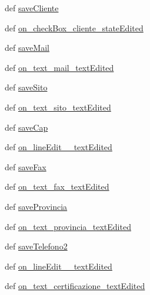 \begin{DoxyCompactItemize}
\item 
def \hyperlink{classmmasgis_1_1anagrafica_1_1MainWindowAnagrafica_a211bc810848f594d4b97622daefb2136}{saveCliente}
\item 
def \hyperlink{classmmasgis_1_1anagrafica_1_1MainWindowAnagrafica_a49cb5bcd710ab2305875e1d5dff5e833}{on\_\-checkBox\_\-cliente\_\-stateEdited}
\item 
def \hyperlink{classmmasgis_1_1anagrafica_1_1MainWindowAnagrafica_a848c61d4921c8052e98a898e7708f224}{saveMail}
\item 
def \hyperlink{classmmasgis_1_1anagrafica_1_1MainWindowAnagrafica_ae1947d5dd3272f69b645d7c59690de17}{on\_\-text\_\-mail\_\-textEdited}
\item 
def \hyperlink{classmmasgis_1_1anagrafica_1_1MainWindowAnagrafica_a3c5ae3353d84a284ad2f940da78ea739}{saveSito}
\item 
def \hyperlink{classmmasgis_1_1anagrafica_1_1MainWindowAnagrafica_aed68f01780840a7592c4b46cf1fc41de}{on\_\-text\_\-sito\_\-textEdited}
\item 
def \hyperlink{classmmasgis_1_1anagrafica_1_1MainWindowAnagrafica_aa1b2ff93cdd2ab41ae8295903011035a}{saveCap}
\item 
def \hyperlink{classmmasgis_1_1anagrafica_1_1MainWindowAnagrafica_a5f185504208c93380aeb97bb14f38b42}{on\_\-lineEdit\_\_\-textEdited}
\item 
def \hyperlink{classmmasgis_1_1anagrafica_1_1MainWindowAnagrafica_a2cd72aa50ba5e97703d7dbca3b55ecad}{saveFax}
\item 
def \hyperlink{classmmasgis_1_1anagrafica_1_1MainWindowAnagrafica_ac9a87c154747985618ff07536352ac94}{on\_\-text\_\-fax\_\-textEdited}
\item 
def \hyperlink{classmmasgis_1_1anagrafica_1_1MainWindowAnagrafica_ab8bb42908234919f619d3c03c5d364b8}{saveProvincia}
\item 
def \hyperlink{classmmasgis_1_1anagrafica_1_1MainWindowAnagrafica_a7a257255f18f61712126b8f288af1654}{on\_\-text\_\-provincia\_\-textEdited}
\item 
def \hyperlink{classmmasgis_1_1anagrafica_1_1MainWindowAnagrafica_aa3da370c75035ee4fec0fc76377e2e8b}{saveTelefono2}
\item 
def \hyperlink{classmmasgis_1_1anagrafica_1_1MainWindowAnagrafica_a4cdbf10bde439c21657497ad2fd47139}{on\_\-lineEdit\_\_\-textEdited}
\item 
def \hyperlink{classmmasgis_1_1anagrafica_1_1MainWindowAnagrafica_a45905eaa4ba5bc27faf60269d039ad15}{on\_\-text\_\-certificazione\_\-textEdited}
\item 

\end{DoxyCompactItemize}
